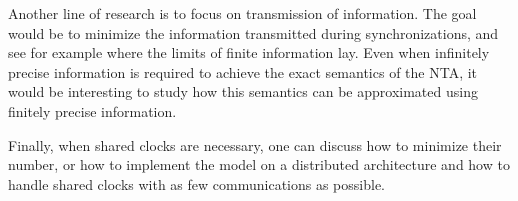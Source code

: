 \documentclass{LMCS}
\theoremstyle{plain}\newtheorem*{prop11}{Proposition~\ref{prop:states} bis}
\begin{document}
Another line of research is to focus on transmission of information. The
goal would be to minimize the information transmitted during synchronizations,
and see for example where the limits of finite information lay.
Even when infinitely precise information is required to achieve the exact
semantics of the NTA, it would be interesting to study how this semantics can be
approximated using finitely precise information.

Finally, when shared clocks are necessary, one can discuss how to minimize their
number, or how to implement the model on a distributed architecture and how to
handle shared clocks with as few communications as possible.

\pagebreak


\end{document}
